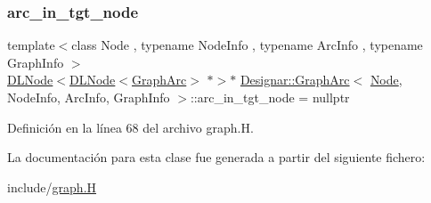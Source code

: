 \subsubsection{\texorpdfstring{arc\+\_\+in\+\_\+tgt\+\_\+node}{arc\_in\_tgt\_node}}
{\footnotesize\ttfamily template$<$class Node , typename Node\+Info , typename Arc\+Info , typename Graph\+Info $>$ \\
\hyperlink{class_designar_1_1_d_l_node}{D\+L\+Node}$<$\hyperlink{class_designar_1_1_d_l_node}{D\+L\+Node}$<$\hyperlink{class_designar_1_1_graph_arc}{Graph\+Arc}$>$ $\ast$$>$$\ast$ \hyperlink{class_designar_1_1_graph_arc}{Designar\+::\+Graph\+Arc}$<$ \hyperlink{namespace_designar_a5af326c65aa2bd26b26c410f2030d09e}{Node}, Node\+Info, Arc\+Info, Graph\+Info $>$\+::arc\+\_\+in\+\_\+tgt\+\_\+node = nullptr\hspace{0.3cm}{\ttfamily [protected]}}



Definición en la línea 68 del archivo graph.\+H.



La documentación para esta clase fue generada a partir del siguiente fichero\+:\begin{DoxyCompactItemize}
\item 
include/\hyperlink{graph_8_h}{graph.\+H}\end{DoxyCompactItemize}
